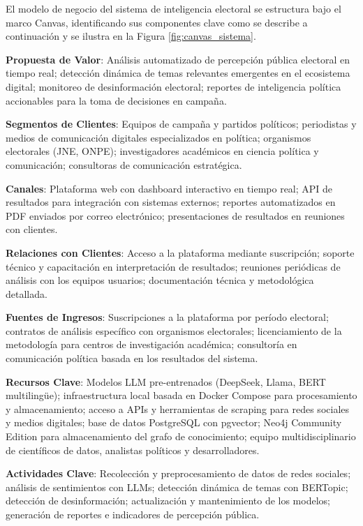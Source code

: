\documentclass[listof=nochaptergap,12pt,times,authoryear]{report}
\begin{document}
El modelo de negocio del sistema de inteligencia electoral se estructura bajo el marco
Canvas, identificando sus componentes clave como se describe a continuación y se ilustra
en la Figura \ref{fig:canvas_sistema}.
 
\textbf{Propuesta de Valor}: Análisis automatizado de percepción pública electoral en
tiempo real; detección dinámica de temas relevantes emergentes en el ecosistema digital;
monitoreo de desinformación electoral; reportes de inteligencia política accionables para
la toma de decisiones en campaña.
 
\textbf{Segmentos de Clientes}: Equipos de campaña y partidos políticos; periodistas
y medios de comunicación digitales especializados en política; organismos electorales
(JNE, ONPE); investigadores académicos en ciencia política y comunicación; consultoras
de comunicación estratégica.
 
\textbf{Canales}: Plataforma web con dashboard interactivo en tiempo real; API de
resultados para integración con sistemas externos; reportes automatizados en PDF
enviados por correo electrónico; presentaciones de resultados en reuniones con clientes.
 
\textbf{Relaciones con Clientes}: Acceso a la plataforma mediante suscripción; soporte
técnico y capacitación en interpretación de resultados; reuniones periódicas de análisis
con los equipos usuarios; documentación técnica y metodológica detallada.
 
\textbf{Fuentes de Ingresos}: Suscripciones a la plataforma por período electoral;
contratos de análisis específico con organismos electorales; licenciamiento de la
metodología para centros de investigación académica; consultoría en comunicación
política basada en los resultados del sistema.
 
\textbf{Recursos Clave}: Modelos LLM pre-entrenados (DeepSeek, Llama, BERT multilingüe); infraestructura local basada en Docker Compose para procesamiento y almacenamiento; acceso a APIs y herramientas de scraping para redes sociales y medios digitales; base de datos PostgreSQL con pgvector; Neo4j Community Edition para almacenamiento del grafo de conocimiento; equipo multidisciplinario de científicos de datos, analistas políticos y desarrolladores.

\textbf{Actividades Clave}: Recolección y preprocesamiento de datos de redes sociales;
análisis de sentimientos con LLMs; detección dinámica de temas con BERTopic;
detección de desinformación; actualización y mantenimiento de los modelos; generación
de reportes e indicadores de percepción pública.
 
\end{document}
